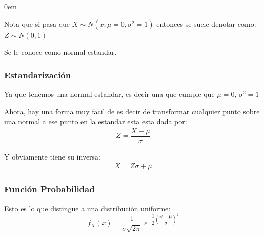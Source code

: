 \documentclass[12pt, fleqn]{report}                             %
\newenvironment{SmallIndentation}[1][0.75em]                    %
        {\begin{adjustwidth}{#1}{}\begin{footnotesize}}             %
        {\end{footnotesize}\end{adjustwidth}}                       %
\newcommand \Quote {\qq}                                        %
\theoremstyle{break}                                            %
\newcommand{\Wrap}[1]{\left( #1 \right)}                        %
\newcommand{\pfrac}[2]{\Wrap{\dfrac{#1}{#2}}}                   %
\begin{document}
\begin{multicols}{2}
\begin{SmallIndentation}[0em]
                            Nota que si pasa que $X \sim N(x; \mu = 0, \sigma^2 = 1)$
                            entonces se suele denotar como:
                            \\$Z \sim N(0, 1)$ 

                            Se le conoce como normal estandar.

                    \subsubsection{Estandarización}  

                        Ya que tenemos una normal estandar, es decir una que cumple que $\mu = 0$,
                        $\sigma^2 = 1$

                        Ahora, hay una forma muy facil de \Quote{estandarizar} es decir
                        de transformar cualquier punto sobre una normal a ese punto en la estandar
                        esta esta dada por:
                        \begin{align*}
                            Z = \dfrac{X - \mu}{\sigma}
                        \end{align*}

                        Y obviamente tiene su inversa:
                        \begin{align*}
                            X = Z\sigma  + \mu
                        \end{align*}


                    \subsubsection{Función Probabilidad}

                        Esto es lo que distingue a una distribución uniforme:
                        \begin{equation*}
                            f_X(x) = \dfrac{1}{\sigma \sqrt{2\pi}} \; e^{-\dfrac{1}{2}\pfrac{x - \mu}{\sigma}^2 }
                        \end{equation*}



\end{SmallIndentation}
\end{multicols}
\end{document}
